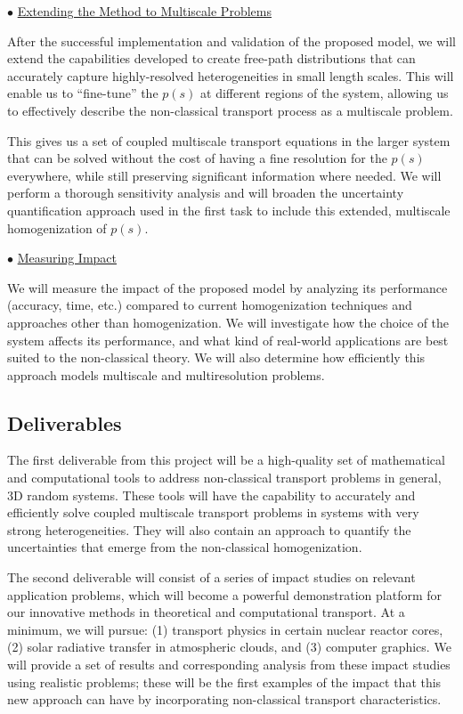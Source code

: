 \documentclass[12pt]{article}
\begin{document}
$\bullet$ \underline{Extending the Method to Multiscale Problems}

After the successful implementation and validation of the proposed model, we will extend the capabilities developed to create free-path distributions that can accurately capture highly-resolved heterogeneities in small length scales.
This will enable us to ``fine-tune'' the $p(s)$ at different regions of the system, allowing us to effectively describe the non-classical transport process as a multiscale problem.

This gives us a set of coupled multiscale transport equations in the larger system that can be solved without the cost of having a fine resolution for the $p(s)$ everywhere, while still preserving significant information where needed.
We will perform a thorough sensitivity analysis and will broaden the uncertainty quantification approach used in the first task to include this extended, multiscale homogenization of $p(s)$.

$\bullet$ \underline{Measuring Impact}

We will measure the impact of the proposed model by analyzing its performance (accuracy, time, etc.) compared to current homogenization techniques and approaches other than homogenization.
We will investigate how the choice of the system affects its performance, and what kind of real-world applications are best suited to the non-classical theory.
We will also determine how efficiently this approach models multiscale and multiresolution problems.


\subsection{Deliverables}

The first deliverable from this project will be a high-quality set of mathematical and computational tools to address non-classical transport problems in general, 3D random systems.
These tools will have the capability to accurately and efficiently solve coupled multiscale transport problems in systems with very strong heterogeneities.
They will also contain an approach to quantify the uncertainties that emerge from the non-classical homogenization.

The second deliverable will consist of a series of impact studies on relevant application problems, which will become a powerful demonstration platform for our innovative methods in theoretical and computational transport.
At a minimum, we will pursue:
(1) transport physics in certain nuclear reactor cores,
(2) solar radiative transfer in atmospheric clouds, and
(3) computer graphics.
We will provide a set of results and corresponding analysis from these impact studies using realistic problems;
these will be the first examples of the impact that this new approach can have by incorporating non-classical transport characteristics.
\end{document}
